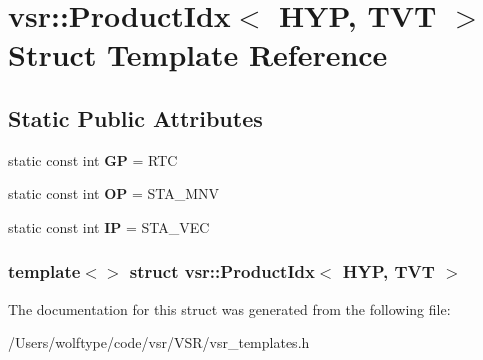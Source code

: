 \hypertarget{structvsr_1_1_product_idx_3_01_h_y_p_00_01_t_v_t_01_4}{\section{vsr\-:\-:Product\-Idx$<$ H\-Y\-P, T\-V\-T $>$ Struct Template Reference}
\label{structvsr_1_1_product_idx_3_01_h_y_p_00_01_t_v_t_01_4}
}
\subsection*{Static Public Attributes}
\begin{DoxyCompactItemize}
\item 
\hypertarget{structvsr_1_1_product_idx_3_01_h_y_p_00_01_t_v_t_01_4_aec2681e4e3813d1bd314cbc6206fed00}{static const int {\bfseries G\-P} = R\-T\-C}\label{structvsr_1_1_product_idx_3_01_h_y_p_00_01_t_v_t_01_4_aec2681e4e3813d1bd314cbc6206fed00}

\item 
\hypertarget{structvsr_1_1_product_idx_3_01_h_y_p_00_01_t_v_t_01_4_ac37ceeba760d6f993b08ff1637e7f4ad}{static const int {\bfseries O\-P} = S\-T\-A\-\_\-\-M\-N\-V}\label{structvsr_1_1_product_idx_3_01_h_y_p_00_01_t_v_t_01_4_ac37ceeba760d6f993b08ff1637e7f4ad}

\item 
\hypertarget{structvsr_1_1_product_idx_3_01_h_y_p_00_01_t_v_t_01_4_a4c525e42e45e5c59a60598409d07e12d}{static const int {\bfseries I\-P} = S\-T\-A\-\_\-\-V\-E\-C}\label{structvsr_1_1_product_idx_3_01_h_y_p_00_01_t_v_t_01_4_a4c525e42e45e5c59a60598409d07e12d}

\end{DoxyCompactItemize}
\subsubsection*{template$<$$>$ struct vsr\-::\-Product\-Idx$<$ H\-Y\-P, T\-V\-T $>$}



The documentation for this struct was generated from the following file\-:\begin{DoxyCompactItemize}
\item 
/\-Users/wolftype/code/vsr/\-V\-S\-R/vsr\-\_\-templates.\-h\end{DoxyCompactItemize}
